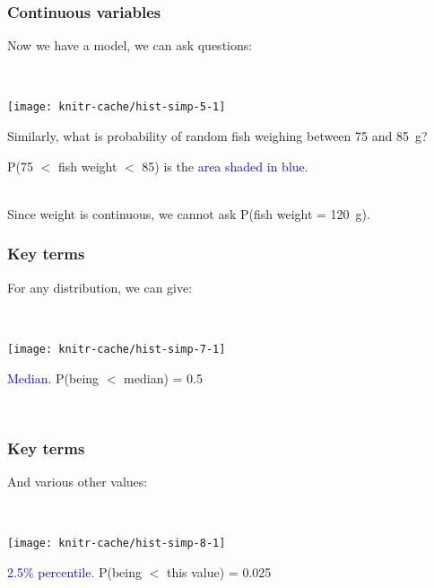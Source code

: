 
\begin{frame}
\frametitle{Continuous variables}

Now we have a model, we can ask questions:

~\\

\begin{knitrout}
\color{fgcolor}
\texttt{[image: knitr-cache/hist-simp-5-1]}

\end{knitrout}

Similarly, what is probability of random fish weighing between 75 and 85~g?

P(75 $<$ fish weight $<$ 85) is the \textcolor{blue}{area shaded in blue}.

~\\

Since weight is continuous, we cannot ask P(fish weight = 120~g).

\end{frame}



\begin{frame}
\frametitle{Key terms}

For any distribution, we can give:

~\\

\begin{knitrout}
\color{fgcolor}
\texttt{[image: knitr-cache/hist-simp-7-1]}

\end{knitrout}

\textcolor{blue}{Median}. P(being $<$ median) = 0.5

~\\

\end{frame}



\begin{frame}
\frametitle{Key terms}

And various other values:

~\\

\begin{knitrout}
\color{fgcolor}
\texttt{[image: knitr-cache/hist-simp-8-1]}

\end{knitrout}

\textcolor{blue}{2.5\% percentile}. P(being $<$ this value) = 0.025

~\\

\end{frame}

